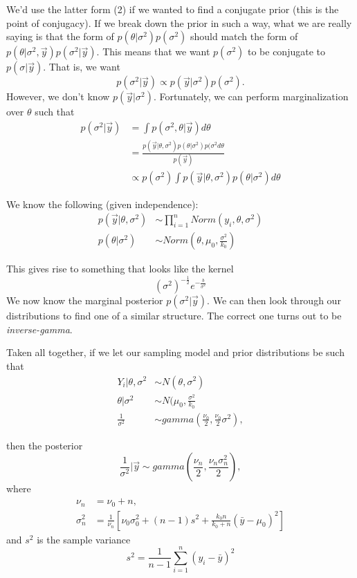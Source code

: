 \documentclass[titlepage, 12pt, leqno]{article}
\begin{document}
We'd use the latter form (2) if we wanted to find a conjugate prior (this is the
point of conjugacy). If we break down the prior in such a way, what we are really
saying is that the form of $p(\theta|\sigma^{2})p(\sigma^{2})$ should match the
form of $p(\theta|\sigma^{2},\vec y)p(\sigma^{2}|\vec y)$. This means that we 
want $p(\sigma^{2})$ to be conjugate to $p(\sigma|\vec y)$. That is, we want
\[
p(\sigma^{2}|\vec y) \propto p(\vec y|\sigma^{2})p(\sigma^{2}).
\]
However, we don't know $p(\vec y|\sigma^{2})$. Fortunately, we can perform
marginalization over $\theta$ such that
\begin{align*}
    p(\sigma^{2}|\vec y) &= \int p(\sigma^{2},\theta|\vec y)d \theta\\
                     &= \frac{
                     p(\vec y|\theta,\sigma^{2})p(\theta|\sigma^{2}) 
                     p(\sigma^{2}d \theta}{p(\vec y)}\\
                     &\propto p(\sigma^{2})\int p(\vec y |\theta, \sigma^{2})
                     p(\theta|\sigma^{2})d \theta
\end{align*}

We know the following (given independence):
\begin{align*}
    p(\vec y|\theta,\sigma^{2}) & \sim \prod_{i=1}^{n}Norm(y_{i}, \theta, 
    \sigma^{2}) \\
    p(\theta|\sigma^{2}) & \sim Norm(\theta,\mu_{0}, \frac{\sigma^{2}}{k_{0}})
\end{align*}

This gives rise to something that looks like the kernel
\[
    (\sigma^{2})^{-\frac{1}{2}}e^{-\frac{b}{\sigma^{2}}}
\]
We now know the marginal posterior $p(\sigma^{2}|\vec y)$. We can then look
through our distributions to find one of a similar structure. The correct one
turns out to be \textit{inverse-gamma}.

Taken all together, if we let our sampling model and prior distributions be such
that
\begin{align*}
    Y_{i}|\theta,\sigma^{2} & \sim N(\theta,\sigma^{2}) \\
    \theta|\sigma^{2} & \sim N(\mu_{0}, \frac{\sigma^{2}}{k_{0}}\\
    \frac{1}{\sigma^{2}} & \sim gamma\left(\frac{\nu_{0}}{2}, \frac{\nu_{0}}{2}
        \sigma^{2} \right),
\end{align*}

then the posterior
\[
\frac{1}{\sigma^{2}}|\vec y \sim gamma \left(\frac{\nu_{n}}{2},
    \frac{\nu_{n}\sigma^{2}_{n}}{2}\right),
\]
where
\begin{align*}
    \nu_{n} &= \nu_{0}+n,\\
    \sigma^{2}_{n} &= \frac{1}{\nu_{n}}\left[\nu_{0}\sigma^{2}_{0} + (n-1)s^{2} +
    \frac{k_{0}n}{k_{0}+n}(\bar y-\mu_{0})^{2}\right]
\end{align*}
and $s^{2}$ is the sample variance
\[
s^{2} = \frac{1}{n-1}\sum_{i=1}^{n}(y_{i}-\bar y)^{2}
\]
\end{document}
